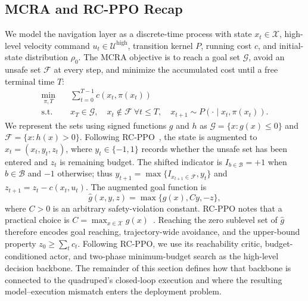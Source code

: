 \documentclass[conference]{IEEEtran}
\begin{document}
\subsection{MCRA and RC-PPO Recap}
We model the navigation layer as a discrete-time process with state $x_t\in
\mathcal{X}$, high-level velocity command $u_t\in\mathcal{U}^{\mathrm{high}}$,
transition kernel $P$, running cost $c$, and initial-state distribution $\rho_0$.
The MCRA objective is to reach a goal set $\mathcal{G}$, avoid an unsafe set
$\mathcal{F}$ at every step, and minimize the accumulated cost until a free terminal
time $T$:
\begin{align}
\min_{\pi,T}\quad &\sum_{t=0}^{T-1}c(x_t,\pi(x_t))\\
\mathrm{s.t.}\quad &x_T\in\mathcal{G},\quad x_t\notin\mathcal{F}\ \forall t\leq T,
\quad x_{t+1}\sim P(\cdot\mid x_t,\pi(x_t)).
\end{align}
We represent the sets using signed functions $g$ and $h$ as
$\mathcal{G}=\{x:g(x)\leq0\}$ and $\mathcal{F}=\{x:h(x)>0\}$. Following
RC-PPO~\cite{so2024}, the state is augmented to $\hat{x}_t=(x_t,y_t,z_t)$,
where $y_t\in\{-1,1\}$ records whether the unsafe set has been entered and $z_t$
is remaining budget. The shifted indicator is
$I_{b\in\mathcal{B}}=+1$ when $b\in\mathcal{B}$ and $-1$ otherwise; thus
$y_{t+1}=\max\{I_{x_{t+1}\in\mathcal{F}},y_t\}$ and
$z_{t+1}=z_t-c(x_t,u_t)$. The augmented goal function is
\begin{equation}
\hat{g}(x,y,z)=\max\{g(x),Cy,-z\},
\end{equation}
where $C>0$ is an arbitrary safety-violation constant. RC-PPO notes that a
practical choice is $C=\max_{x\in\mathcal{X}}g(x)$~\cite{so2024}. Reaching the
zero sublevel set of $\hat{g}$ therefore encodes goal reaching, trajectory-wide
avoidance, and the upper-bound property $z_0\geq\sum_t c_t$. Following RC-PPO, we
use its reachability critic, budget-conditioned actor, and two-phase minimum-budget
search as the high-level decision backbone. The remainder of this section defines
how that backbone is connected to the quadruped's closed-loop execution and where
the resulting model--execution mismatch enters the deployment problem.
\end{document}
